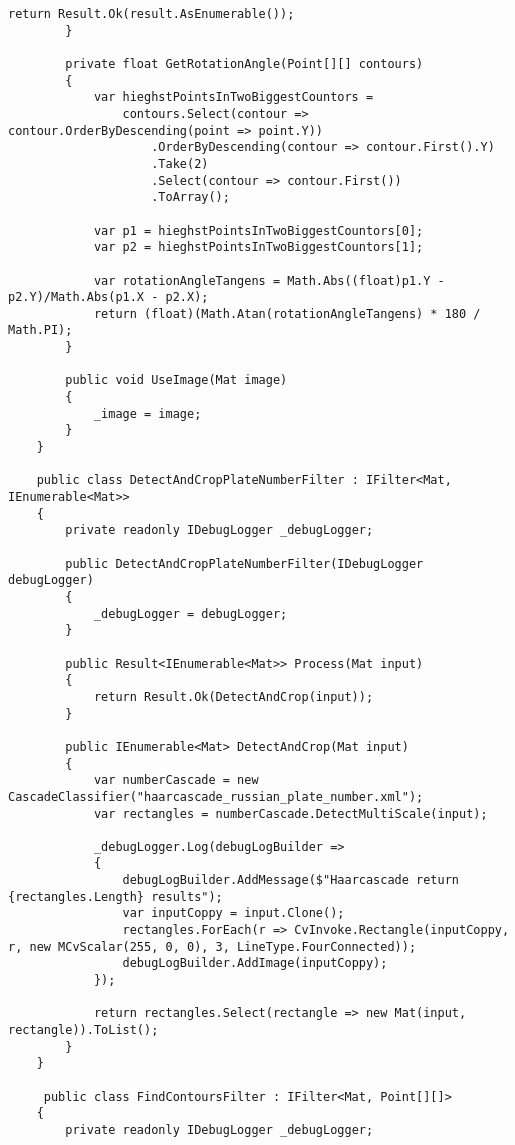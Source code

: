 \begin{lstlisting}[style=fsharpstyle,caption={Исходный код}, label=lst:recognition_result_handler]
            return Result.Ok(result.AsEnumerable());
        }

        private float GetRotationAngle(Point[][] contours)
        {
            var hieghstPointsInTwoBiggestCountors =
                contours.Select(contour => contour.OrderByDescending(point => point.Y))
                    .OrderByDescending(contour => contour.First().Y)
                    .Take(2)
                    .Select(contour => contour.First())
                    .ToArray();

            var p1 = hieghstPointsInTwoBiggestCountors[0];
            var p2 = hieghstPointsInTwoBiggestCountors[1];

            var rotationAngleTangens = Math.Abs((float)p1.Y - p2.Y)/Math.Abs(p1.X - p2.X);
            return (float)(Math.Atan(rotationAngleTangens) * 180 / Math.PI);
        }

        public void UseImage(Mat image)
        {
            _image = image;
        }
    }

    public class DetectAndCropPlateNumberFilter : IFilter<Mat, IEnumerable<Mat>>
    {
        private readonly IDebugLogger _debugLogger;

        public DetectAndCropPlateNumberFilter(IDebugLogger debugLogger)
        {
            _debugLogger = debugLogger;
        }

        public Result<IEnumerable<Mat>> Process(Mat input)
        {
            return Result.Ok(DetectAndCrop(input));
        }

        public IEnumerable<Mat> DetectAndCrop(Mat input)
        {
            var numberCascade = new CascadeClassifier("haarcascade_russian_plate_number.xml");
            var rectangles = numberCascade.DetectMultiScale(input);

            _debugLogger.Log(debugLogBuilder =>
            {
                debugLogBuilder.AddMessage($"Haarcascade return {rectangles.Length} results");
                var inputCoppy = input.Clone();
                rectangles.ForEach(r => CvInvoke.Rectangle(inputCoppy, r, new MCvScalar(255, 0, 0), 3, LineType.FourConnected));
                debugLogBuilder.AddImage(inputCoppy);
            });

            return rectangles.Select(rectangle => new Mat(input, rectangle)).ToList();
        }
    }

     public class FindContoursFilter : IFilter<Mat, Point[][]>
    {
        private readonly IDebugLogger _debugLogger;


\end{lstlisting}
